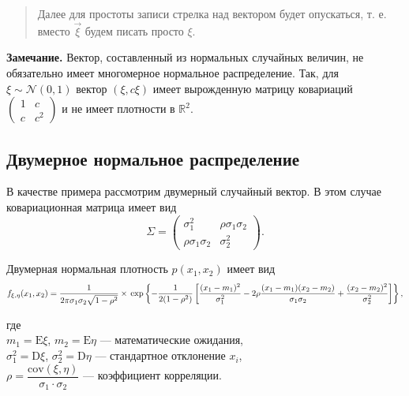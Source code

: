 \documentclass[11pt,a4paper]{article}
\begin{document}
\begin{quote}
Далее для простоты записи стрелка над вектором будет опускаться, т. е.
вместо \(\vec{\xi}\) будем писать просто \(\xi\).
\end{quote}

    \textbf{Замечание.} Вектор, составленный из нормальных случайных
величин, не обязательно имеет многомерное нормальное распределение. Так,
для \(\xi \sim \mathcal{N}(0,1)\) вектор \((\xi, c\xi)\) имеет
вырожденную матрицу ковариаций
\(\begin{pmatrix}  1 & c \\  c & c^2 \end{pmatrix}\) и не имеет
плотности в \(\mathbb{R}^2\).

    \hypertarget{ux434ux432ux443ux43cux435ux440ux43dux43eux435-ux43dux43eux440ux43cux430ux43bux44cux43dux43eux435-ux440ux430ux441ux43fux440ux435ux434ux435ux43bux435ux43dux438ux435}{%
\subsection{Двумерное нормальное
распределение}\label{ux434ux432ux443ux43cux435ux440ux43dux43eux435-ux43dux43eux440ux43cux430ux43bux44cux43dux43eux435-ux440ux430ux441ux43fux440ux435ux434ux435ux43bux435ux43dux438ux435}}

В качестве примера рассмотрим двумерный случайный вектор. В этом случае
ковариационная матрица имеет вид \[
\Sigma =
\begin{pmatrix}
    \sigma_1^2 & \rho \sigma_1 \sigma_2 \\
    \rho \sigma_1 \sigma_2 & \sigma_2^2
\end{pmatrix}.
\]

    Двумерная нормальная плотность \(p(x_1, x_2)\) имеет вид \[
  f_{\xi,\eta}(x_1, x_2) = \frac{1}{2\pi\sigma_1\sigma_2\sqrt{1-\rho^2}} \times \\
  \exp \left\{-\frac{1}{2(1-\rho^2)} \left[ \frac{(x_1-m_1)^2}{\sigma_1^2} - 2\rho\frac{(x_1-m_1)(x_2-m_2)}{\sigma_1\sigma_2} + \frac{(x_2-m_2)^2}{\sigma_2^2} \right]\right\},
\]

где\\
\(m_1 = \mathrm{E} \xi\), \(m_2 = \mathrm{E} \eta\) --- математические
ожидания,\\
\(\sigma_1^2 = \mathrm{D} \xi\), \(\sigma_2^2 = \mathrm{D} \eta\) ---
стандартное отклонение \(x_i\),\\
\(\rho = \dfrac{\mathrm{cov}(\xi, \eta)}{\sigma_1 \cdot \sigma_2}\) ---
коэффициент корреляции.
\end{document}
